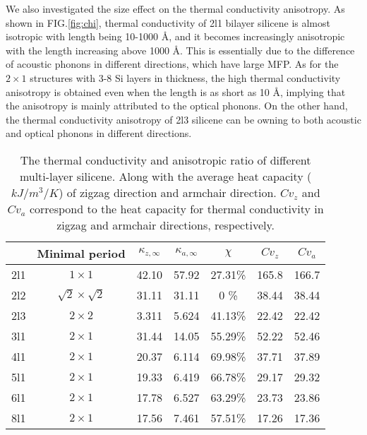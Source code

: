 \documentclass[aps,prb,twocolumn,showpacs,amsmath,amssymb]{revtex4-1}
\newcommand{\angstrom}{\mbox{\normalfont\AA}}
\begin{document}
We also investigated the size effect on the thermal conductivity anisotropy. As shown in FIG.\ref{fig:chi}, thermal conductivity of  2l1 bilayer silicene is almost isotropic  with length being 10-1000 \angstrom, and it becomes increasingly anisotropic with the length increasing  above 1000  \angstrom. This is essentially due to the difference of acoustic phonons in different directions,  which have large MFP.  As for the $2\times1$ structures with 3-8 Si layers in thickness, the high thermal conductivity anisotropy is obtained even when the length is as short as 10 \angstrom, implying that the anisotropy is  mainly attributed to the optical phonons. On the other hand, the thermal conductivity anisotropy of 2l3 silicene can be owning to both acoustic and  optical phonons in different directions.

\begin{table*}
  \caption{\label{tab:table1}
    The thermal conductivity and anisotropic ratio of different multi-layer silicene. Along with the average heat capacity ($kJ/m^3/K$) of zigzag direction and armchair direction. $Cv_z$ and $Cv_a$ correspond to the  heat capacity for thermal conductivity in  zigzag and armchair directions, respectively. }
  \begin{ruledtabular}
    \begin{tabular}{ccccccc}
          & Minimal period
          & $\kappa_{z,\infty}$
          & $\kappa_{a,\infty}$
          & $\chi$
          & $Cv_{z}$
          & $Cv_{a}$                                                           \\
      \hline
      2l1 & $1 \times 1$             & 42.10 & 57.92 & 27.31\% & 165.8 & 166.7 \\
      2l2 & $\sqrt{2}\times\sqrt{2}$ & 31.11 & 31.11 & 0    \% & 38.44 & 38.44 \\
      2l3 & $2 \times 2$             & 3.311 & 5.624 & 41.13\% & 22.42 & 22.42 \\
      3l1 & $2 \times 1$             & 31.44 & 14.05 & 55.29\% & 52.22 & 52.46 \\
      4l1 & $2 \times 1$             & 20.37 & 6.114 & 69.98\% & 37.71 & 37.89 \\
      5l1 & $2 \times 1$             & 19.33 & 6.419 & 66.78\% & 29.17 & 29.32 \\
      6l1 & $2 \times 1$             & 17.78 & 6.527 & 63.29\% & 23.73 & 23.86 \\
      8l1 & $2 \times 1$             & 17.56 & 7.461 & 57.51\% & 17.26 & 17.36 \\
    \end{tabular}
  \end{ruledtabular}
\end{table*}
\end{document}
